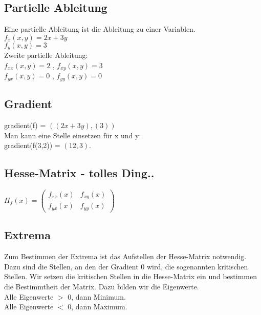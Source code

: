 \documentclass[a4paper,landscape, 11pt]{article}
\begin{document}
\begin{multicols}{4}
\begin{small}
       \subsection{Partielle Ableitung}
       Eine partielle Ableitung ist die Ableitung zu einer Variablen.\\
       $f_x(x,y) = 2x + 3y$ \\
       $f_y(x,y) = 3$ \\
       Zweite partielle Ableitung: \\
       $f_{xx}(x,y) = 2$ , 
       $f_{xy}(x,y) = 3$ \\
       $f_{yx}(x,y) = 0$ ,
       $f_{yy}(x,y) = 0$ 
       \subsection{Gradient}
       gradient(f) = $((2x + 3y), (3))$ \\
       Man kann eine Stelle einsetzen für x und y:\\
       gradient(f(3,2)) = $(12, 3)$.
       
       \subsection{Hesse-Matrix - tolles Ding..}
       $H_f(x) = \left( 
       \begin{matrix}
       f_{xx}(x) & f_{xy}(x) \\
       f_{yx}(x) & f_{yy}(x)
       \end{matrix}
       \right)
       $
       
       \subsection{Extrema}
       Zum Bestimmen der Extrema ist das Aufstellen der Hesse-Matrix notwendig.
       Dazu sind die Stellen, an den der Gradient 0 wird, die sogenannten kritischen Stellen. Wir setzen die kritischen Stellen in die Hesse-Matrix ein und bestimmen die Bestimmtheit der Matrix. Dazu bilden wir die Eigenwerte. \\
       Alle Eigenwerte $>$ 0, dann Minimum.\\
       Alle Eigenwerte $<$ 0, dann Maximum.

\end{small}
\end{multicols}
\end{document}
